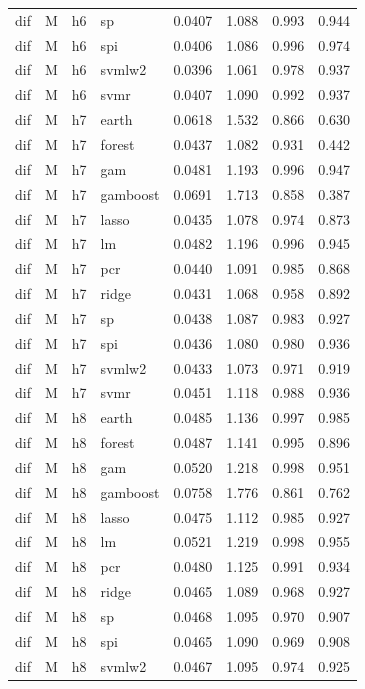 \begin{ThreePartTable}
\begin{longtable}[t]{llclcccc}
dif & M & h6 & sp & 0.0407 & 1.088 & 0.993 & 0.944\\
dif & M & h6 & spi & 0.0406 & 1.086 & 0.996 & 0.974\\
dif & M & h6 & svmlw2 & 0.0396 & 1.061 & 0.978 & 0.937\\
dif & M & h6 & svmr & 0.0407 & 1.090 & 0.992 & 0.937\\
\addlinespace
dif & M & h7 & earth & 0.0618 & 1.532 & 0.866 & 0.630\\
dif & M & h7 & forest & 0.0437 & 1.082 & 0.931 & 0.442\\
dif & M & h7 & gam & 0.0481 & 1.193 & 0.996 & 0.947\\
dif & M & h7 & gamboost & 0.0691 & 1.713 & 0.858 & 0.387\\
dif & M & h7 & lasso & 0.0435 & 1.078 & 0.974 & 0.873\\
dif & M & h7 & lm & 0.0482 & 1.196 & 0.996 & 0.945\\
dif & M & h7 & pcr & 0.0440 & 1.091 & 0.985 & 0.868\\
dif & M & h7 & ridge & 0.0431 & 1.068 & 0.958 & 0.892\\
dif & M & h7 & sp & 0.0438 & 1.087 & 0.983 & 0.927\\
dif & M & h7 & spi & 0.0436 & 1.080 & 0.980 & 0.936\\
dif & M & h7 & svmlw2 & 0.0433 & 1.073 & 0.971 & 0.919\\
dif & M & h7 & svmr & 0.0451 & 1.118 & 0.988 & 0.936\\
\addlinespace
dif & M & h8 & earth & 0.0485 & 1.136 & 0.997 & 0.985\\
dif & M & h8 & forest & 0.0487 & 1.141 & 0.995 & 0.896\\
dif & M & h8 & gam & 0.0520 & 1.218 & 0.998 & 0.951\\
dif & M & h8 & gamboost & 0.0758 & 1.776 & 0.861 & 0.762\\
dif & M & h8 & lasso & 0.0475 & 1.112 & 0.985 & 0.927\\
dif & M & h8 & lm & 0.0521 & 1.219 & 0.998 & 0.955\\
dif & M & h8 & pcr & 0.0480 & 1.125 & 0.991 & 0.934\\
dif & M & h8 & ridge & 0.0465 & 1.089 & 0.968 & 0.927\\
dif & M & h8 & sp & 0.0468 & 1.095 & 0.970 & 0.907\\
dif & M & h8 & spi & 0.0465 & 1.090 & 0.969 & 0.908\\
dif & M & h8 & svmlw2 & 0.0467 & 1.095 & 0.974 & 0.925\\

\end{longtable}
\end{ThreePartTable}
